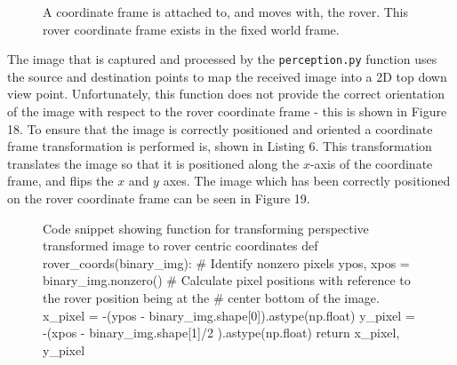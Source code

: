 \documentclass[a4paper]{article}
\begin{document}
\begin{figure}[h]
\centering
{}
\caption{A coordinate frame is attached to, and moves with, the rover. This rover coordinate frame exists in the fixed world frame.}
\end{figure}

\vspace{1cm}

The image that is captured and processed by the \verb|perception.py| function uses the source and destination points to map the received image into a 2D top down view point. Unfortunately, this function does not provide the correct orientation of the image with respect to the rover coordinate frame - this is shown in Figure 18. To ensure that the image is correctly positioned and oriented a coordinate frame transformation is performed is, shown in Listing 6. This transformation translates the image so that it is positioned along the $x$-axis of the coordinate frame, and flips the $x$ and $y$ axes. The image which has been correctly positioned on the rover coordinate frame can be seen in Figure 19. 

\vspace{1cm}

\begin{figure}[h]\scriptsize
\centering
\begin{sexylisting}{Code snippet showing function for transforming perspective transformed image to rover centric coordinates}
def rover_coords(binary_img):
    # Identify nonzero pixels
    ypos, xpos = binary_img.nonzero()
    # Calculate pixel positions with reference to the rover position being at the 
    # center bottom of the image.  
    x_pixel = -(ypos - binary_img.shape[0]).astype(np.float)
    y_pixel = -(xpos - binary_img.shape[1]/2 ).astype(np.float)
    return x_pixel, y_pixel
\end{sexylisting}
\end{figure}
\end{document}
